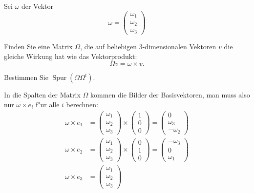 Sei $\omega$ der Vektor
\[
\omega=\begin{pmatrix}\omega_1\\\omega_2\\\omega_3\end{pmatrix}
\]
\begin{teilaufgaben}
\item
Finden Sie eine Matrix $\Omega$, die auf beliebigen $3$-dimensionalen Vektoren $v$ die gleiche
Wirkung hat wie das Vektorprodukt:
\[
\Omega v=\omega\times v.
\]
\item Bestimmen Sie $\operatorname{Spur}(\Omega\Omega^t)$.
\end{teilaufgaben}

\begin{loesung}
\begin{teilaufgaben}
\item In die Spalten der Matrix $\Omega$ kommen die Bilder der Basisvektoren,
man muss also nur $\omega\times e_i$ f"ur alle $i$ berechnen:
\begin{align*}
\omega\times e_1
&=
\begin{pmatrix}\omega_1\\\omega_2\\\omega_3\end{pmatrix}
\times
\begin{pmatrix}1\\0\\0\end{pmatrix}
=
\begin{pmatrix}0\\\omega_3\\-\omega_2\end{pmatrix}
\\
\omega\times e_2
&=
\begin{pmatrix}\omega_1\\\omega_2\\\omega_3\end{pmatrix}
\times
\begin{pmatrix}0\\1\\0\end{pmatrix}
=
\begin{pmatrix}-\omega_3\\0\\\omega_1\end{pmatrix}
\\
\omega\times e_3
&=
\begin{pmatrix}\omega_1\\\omega_2\\\omega_3\end{pmatrix}

\end{align*}
\end{teilaufgaben}
\end{loesung}
